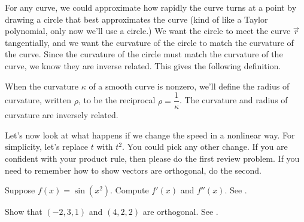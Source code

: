 For any curve, we could approximate how rapidly the curve turns at a point by drawing a circle that best approximates the curve (kind of like a Taylor polynomial, only now we'll use a circle.) We want the circle to meet the curve $\vec r$ tangentially, and we want the curvature of the circle to match the curvature of the curve. Since the curvature of the circle must match the curvature of the curve, we know they are inverse related.  This gives the following definition.

\begin{definition}%
When the curvature $\kappa$ of a smooth curve is nonzero, we'll define the radius of curvature, written $\rho$, to be the reciprocal $\rho = \dfrac{1}{\kappa}$. The curvature and radius of curvature are inversely related. 
\end{definition}



Let's now look at what happens if we change the speed in a nonlinear way.  For simplicity, let's replace $t$ with $t^2$.  You could pick any other change. If you are confident with your product rule, then please do the first review problem. If you need to remember how to show vectors are orthogonal, do the second.

\begin{review*}
 Suppose $f(x) = \sin(x^2)$.  Compute $f'(x)$ and $f''(x)$.  See 
.
\end{review*}
\begin{review*}
 Show that $(-2,3,1)$ and $(4,2,2)$ are orthogonal. See 
.
\end{review*}



